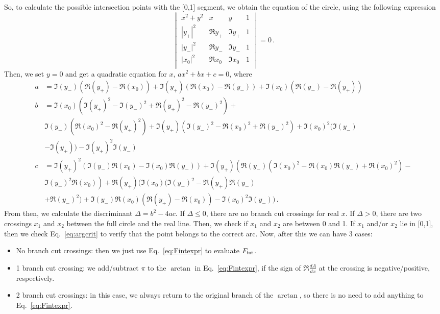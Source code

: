 \documentclass[twoside]{article}
\begin{document}
So, to calculate the possible intersection points with the [0,1] segment, we obtain the equation of the circle, using the following expression
\begin{equation}
\begin{vmatrix}
x^2 + y^2 & x & y & 1 \\
|y_+|^2 & \Re y_+ & \Im y_+ & 1  \\
|y_-|^2 & \Re y_- & \Im y_- & 1  \\
|x_0|^2 & \Re x_0 & \Im x_0 & 1  \\
\end{vmatrix}
=0\,.
\end{equation}
Then, we set $y=0$ and get a quadratic equation for $x$, $a x^2 + b x + c = 0$, where 
\begin{align}
a &= \Im(y_-) (\Re(y_+)-\Re(x_0))+\Im(y_+) (\Re(x_0)-\Re(y_-))+\Im(x_0) (\Re(y_-)-\Re(y_+)) \\
b &= \Im(x_0) \left(\Im(y_+)^2-\Im(y_-)^2+\Re(y_+)^2-\Re(y_-)^2\right)+ \\
&\Im(y_-) \left(\Re(x_0)^2-\Re(y_+)^2\right)+\Im(y_+) \left(\Im(y_-)^2-\Re(x_0)^2+\Re(y_-)^2\right)+\Im(x_0)^2 (\Im(y_-)\\
&-\Im(y_+))-\Im(y_+)^2 \Im(y_-) \\
c &= \Im(y_+)^2 (\Im(y_-) \Re(x_0)-\Im(x_0) \Re(y_-))+\Im(y_+) \left(\Re(y_-) \left(\Im(x_0)^2-\Re(x_0) \Re(y_-)+\Re(x_0)^2\right)-\right.\\
&\left.\Im(y_-)^2 \Re(x_0)\right)+\Re(y_+) (\Im(x_0) (\Im(y_-)^2-\Re(y_+) \Re(y_-)\\
&+\Re(y_-)^2)+\Im(y_-) \Re(x_0) (\Re(y_+)-\Re(x_0))-\Im(x_0)^2 \Im(y_-))\,.
\end{align}
From then, we calculate the discriminant $\Delta = b^2 - 4 a c$. If $\Delta \leq 0$, there are no branch cut crossings for real $x$. If $\Delta>0$, there are two crossings $x_1$ and $x_2$ between the full circle and the real line. Then, we check if $x_1$ and $x_2$ are between 0 and 1. If $x_1$ and/or $x_2$ lie in [0,1], then we check Eq.~\eqref{eq:argcrit} to verify that the point belongs to the correct arc.
Now, after this we can have 3 cases:
\begin{itemize}
\item No branch cut crossings: then we just use Eq.~\eqref{eq:Fintexpr} to evaluate $F_{\rm int}$.
\item 1 branch cut crossing: we add/subtract $\pi$ to the $\arctan$ in Eq.~\eqref{eq:Fintexpr}, if the sign of $\Re \frac{dA}{dx}$ at the crossing is negative/positive, respectively.
\item 2 branch cut crossings: in this case, we always return to the original branch of the $\arctan$, so there is no need to add anything to Eq.~\eqref{eq:Fintexpr}.
\end{itemize}
\end{document}
